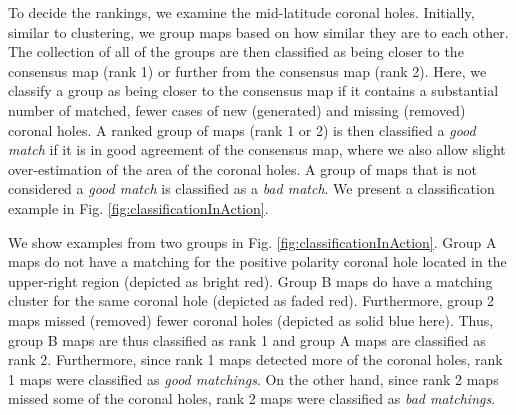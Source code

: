 \documentclass[journal]{IEEEtran}
\begin{document}
To decide the rankings, we examine the mid-latitude coronal holes.
Initially, similar to clustering, we group maps based on how similar
they are to each other.
The collection of all of the groups are then classified 
as being closer to the consensus map (rank 1)
or further from the consensus map (rank 2).
Here, we classify a group as being closer to the consensus map if
it contains a substantial number of matched, 
fewer cases of new (generated) and missing (removed) coronal holes.
A ranked group of maps (rank 1 or 2) is then classified a \textit{good match}
if it is in good agreement of the consensus map, where we also
allow slight over-estimation of the area of the coronal holes.
A group of maps that is not considered a \textit{good match} is
classified as a \textit{bad match}. 
We present a classification example in Fig. \ref{fig:classificationInAction}.

We show examples from two groups in Fig. \ref{fig:classificationInAction}.
Group A maps do not have a matching for the positive polarity coronal hole located 
in the upper-right region (depicted as bright red).
Group B maps do have a matching cluster for the same coronal hole
(depicted as faded red).
Furthermore, group 2 maps missed (removed) fewer coronal holes
(depicted as solid blue here).
Thus, group B maps are thus classified as rank 1 and group A maps 
are classified as rank 2.
Furthermore, since rank 1 maps detected more of the coronal holes,
  rank 1 maps were classified as \textit{good matchings}.
On the other hand, since rank 2 maps missed some of the coronal holes,  
  rank 2 maps were classified as \textit{bad matchings}.
\end{document}
